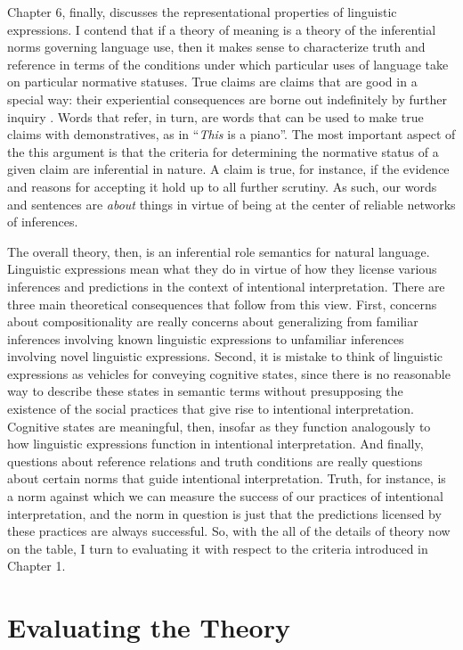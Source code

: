 Chapter 6, finally, discusses the representational properties of linguistic expressions. I contend that if a theory of meaning is a theory of the inferential norms governing language use, then it makes sense to characterize truth and reference in terms of the conditions under which particular uses of language take on particular normative statuses. True claims are claims that are good in a special way: their experiential consequences are borne out indefinitely by further inquiry \citep{Peirce:1992,Misak:2013,Misak:2007}. Words that refer, in turn, are words that can be used to make true claims with demonstratives, as in ``\textit{This} is a piano''. The most important aspect of the this argument is that the criteria for determining the normative status of a given claim are inferential in nature. A claim is true, for instance, if the evidence and reasons for accepting it hold up to all further scrutiny. As such, our words and sentences are \textit{about} things in virtue of being at the center of reliable networks of inferences.

The overall theory, then, is an inferential role semantics for natural language. Linguistic expressions mean what they do in virtue of how they license various inferences and predictions in the context of intentional interpretation. There are three main theoretical consequences that follow from this view. First, concerns about compositionality are really concerns about generalizing from familiar inferences involving known linguistic expressions to unfamiliar inferences involving novel linguistic expressions. Second, it is mistake to think of linguistic expressions as vehicles for conveying cognitive states, since there is no reasonable way to describe these states in semantic terms without presupposing the existence of the social practices that give rise to intentional interpretation. Cognitive states are meaningful, then, insofar as they function analogously to how linguistic expressions function in intentional interpretation. And finally, questions about reference relations and truth conditions are really questions about certain norms that guide intentional interpretation. Truth, for instance, is a norm against which we can measure the success of our practices of intentional interpretation, and the norm in question is just that the predictions licensed by these practices are always successful. So, with the all of the details of theory now on the table, I turn to evaluating it with respect to the criteria introduced in Chapter 1. 

\section{Evaluating the Theory}

